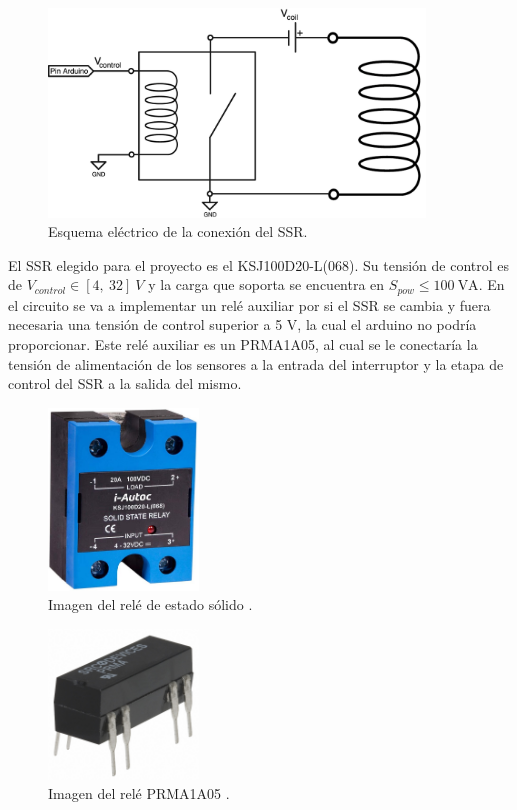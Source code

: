 \begin{figure}[H]
    \centering
    \includegraphics[width=10cm]{FigurasMemoria/conexionRele.png}
    \caption{Esquema eléctrico de la conexión del SSR.}
    \label{fig:conexionRele} %
\end{figure}

El SSR elegido para el proyecto es el KSJ100D20-L(068). Su tensión de control es de \(V_{control}\in [4,~32]~V\) y la carga que soporta se encuentra en \(S_{pow}\leq 100~\text{VA}\). En el circuito se va a implementar un relé auxiliar por si el SSR se cambia y fuera necesaria una tensión de control superior a 5 V, la cual el arduino no podría proporcionar. Este relé auxiliar es un PRMA1A05, al cual se le conectaría la tensión de alimentación de los sensores a la entrada del interruptor y la etapa de control del SSR a la salida del mismo.


\begin{figure}[H]
    \centering
    \includegraphics[width=4cm]{FigurasMemoria/SSRrelay.jpeg}
    \caption{Imagen del relé de estado sólido \citep{rs2024ksj}.}
    \label{fig:SSRrelay} %
\end{figure}

\begin{figure}[H]
    \centering
    \includegraphics[width=4cm]{FigurasMemoria/PRMArelay.jpeg}
    \caption{Imagen del relé PRMA1A05 \citep{coto2024prma1a05b}.}
    \label{fig:PRMArelay} %
\end{figure}

